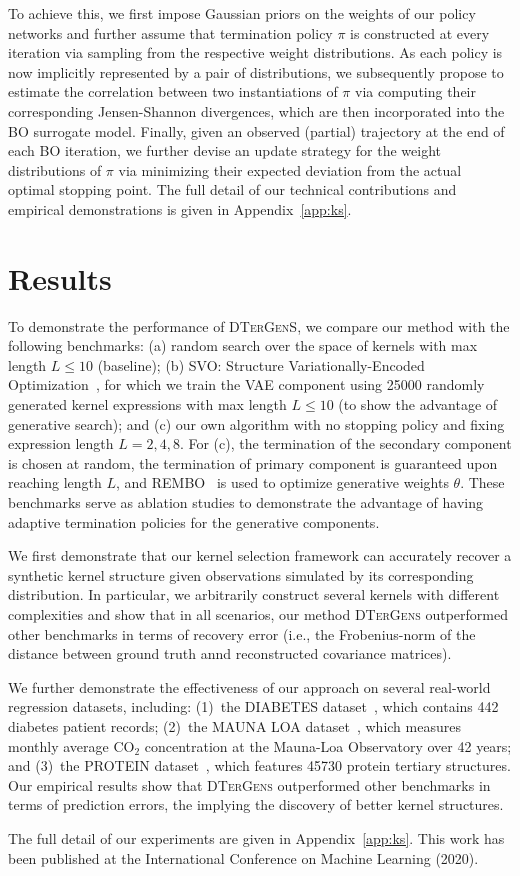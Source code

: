 To achieve this, we first impose Gaussian priors on the weights of our policy networks and further assume that termination policy $\pi$ is constructed at every iteration via sampling from the respective weight distributions. As each policy is now implicitly represented by a pair of distributions, we subsequently propose to estimate the correlation between two instantiations of $\pi$ via computing their corresponding Jensen-Shannon divergences, which are then incorporated into the BO surrogate model. Finally, given an observed (partial) trajectory at the end of each BO iteration, we further devise an update strategy for the weight distributions of $\pi$ via minimizing their expected deviation from the actual optimal stopping point. The full detail of our technical contributions and empirical demonstrations is given in Appendix~\ref{app:ks}.

\section{Results}
To demonstrate the performance of \textsc{DTerGenS}, we compare our method with the following benchmarks: (a) random search over the space of kernels with max length $L \leq 10$ (baseline); (b) \textsc{SVO}: Structure Variationally-Encoded Optimization~\cite{Lu18}, for which we train the VAE component using 25000 randomly generated kernel expressions with max length $L \leq 10$ (to show the advantage of generative search); and (c) our own algorithm with no stopping policy and fixing expression length $L = 2, 4, 8$. For (c), the termination of the secondary component is chosen at random, the termination of primary component is guaranteed upon reaching length $L$, and REMBO~\cite{Wang16} is used to optimize generative weights $\theta$. These benchmarks serve as ablation studies to demonstrate the advantage of having adaptive termination policies for the generative components. 

We first demonstrate that our kernel selection framework can accurately recover a synthetic kernel structure given observations simulated by its corresponding distribution. In particular, we arbitrarily construct several kernels with different complexities and show that in all scenarios, our method \textsc{DTerGens} outperformed other benchmarks in terms of recovery error (i.e., the Frobenius-norm of the distance between ground truth annd reconstructed covariance matrices). 

We further demonstrate the effectiveness of our approach on several real-world regression datasets, including: (1)~the DIABETES dataset~\cite{UCI_diabetes_data}, which contains 442 diabetes patient records; (2)~the MAUNA LOA dataset~\cite{mauna_loa_data}, which measures monthly average $\textrm{CO}_2$ concentration at the Mauna-Loa Observatory over 42 years; and (3)~the PROTEIN dataset~\cite{UCI_protein_data}, which features 45730 protein tertiary structures. Our empirical results show that \textsc{DTerGens} outperformed other benchmarks in terms of prediction errors, the implying the discovery of better kernel structures. 

The full detail of our experiments are given in Appendix~\ref{app:ks}. This work has been published at the International Conference on Machine Learning (2020).